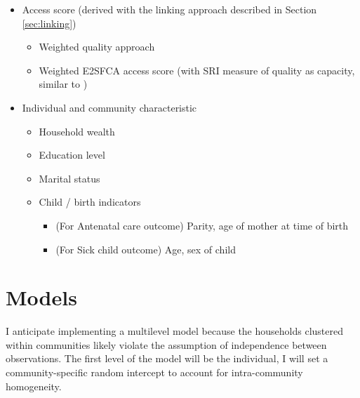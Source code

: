 \begin{itemize}
    \item Access score (derived with the linking approach described in Section \ref{sec:linking})
    \begin{itemize}
        \item Weighted quality approach
        \item Weighted E2SFCA access score (with SRI measure of quality as capacity, similar to \cite{gao_understanding_2019})
    \end{itemize}
    \item Individual and community characteristic
    \begin{itemize}
        \item Household wealth
        \item Education level
        \item Marital status
        \item Child / birth indicators
        \begin{itemize}
            \item (For Antenatal care outcome) Parity, age of mother at time of birth
            \item (For Sick child outcome) Age, sex of child
        \end{itemize}
    \end{itemize}
\end{itemize}


\section{Models}

I anticipate implementing a multilevel model because the households clustered within communities likely violate the assumption of independence between observations. The first level of the model will be the individual, I will set a community-specific random intercept to account for intra-community homogeneity. 